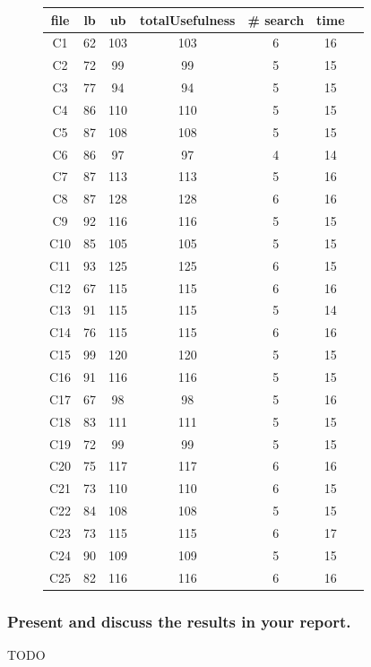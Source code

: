 \documentclass[a4paper ,12pt,french]{article}
\begin{document}
\begin{figure}[!h]
\begin{tabular}{|c|c|c|c|c|c|c|}
\hline
file&lb&ub&totalUsefulness&\# search&time\\
\hline
\hline
C1&62&103&103&6&16\\ \hline
C2&72&99&99&5&15\\ \hline
C3&77&94&94&5&15\\ \hline
C4&86&110&110&5&15\\ \hline
C5&87&108&108&5&15\\ \hline
C6&86&97&97&4&14\\ \hline
C7&87&113&113&5&16\\ \hline
C8&87&128&128&6&16\\ \hline
C9&92&116&116&5&15\\ \hline
C10&85&105&105&5&15\\ \hline
C11&93&125&125&6&15\\ \hline
C12&67&115&115&6&16\\ \hline
C13&91&115&115&5&14\\ \hline
C14&76&115&115&6&16\\ \hline
C15&99&120&120&5&15\\ \hline
C16&91&116&116&5&15\\ \hline
C17&67&98&98&5&16\\ \hline
C18&83&111&111&5&15\\ \hline
C19&72&99&99&5&15\\ \hline
C20&75&117&117&6&16\\ \hline
C21&73&110&110&6&15\\ \hline
C22&84&108&108&5&15\\ \hline
C23&73&115&115&6&17\\ \hline
C24&90&109&109&5&15\\ \hline
C25&82&116&116&6&16\\ \hline


\end{tabular}
\end{figure}



\subsubsection{Present and discuss the results in your report.}
TODO
\end{document}
